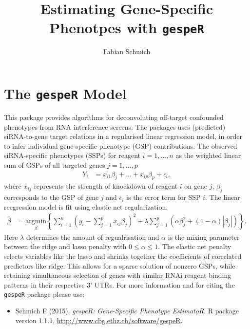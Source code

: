 \documentclass{article}\usepackage[]{graphicx}\usepackage[]{color}
\begin{document}
\title{Estimating Gene-Specific Phenotpes with \texttt{gespeR}}
\author{Fabian Schmich}

\maketitle
\tableofcontents

\section{The \texttt{gespeR} Model}
This package provides algorithms for deconvoluting off-target confounded phenotypes from RNA interference screens. The packages uses (predicted) siRNA-to-gene target relations in a regularised linear regression model, in order to infer individual gene-specific phenotype (GSP) contributions. The observed siRNA-specific phenotypes (SSPs) for reagent $i = 1,\ldots,n$ as the weighted linear sum of GSPs of all targeted genes $j = 1,\ldots,p$
\begin{align}
Y_i &= x_{i1}\beta_j + \ldots + x_{ip}\beta_p + \epsilon_i,
\end{align}
where $x_{ij}$ represents the strength of knockdown of reagent $i$ on gene $j$, $\beta_j$ corresponds to the GSP of gene $j$ and $\epsilon_i$ is the error term for SSP $i$. The linear reegression model is fit using elastic net regularization:
\begin{align}
\hat{\beta} &= \underset{\beta}{\text{argmin}} \left\{ \sum_{i=1}^n \left( y_i - \sum_{j=1}^p x_{ij}\beta_j \right)^2 + \lambda \sum_{j=1}^p \left(  \alpha\beta_j^2 + \left(1 - \alpha \right) |\beta_j| \right) \right\}.
\end{align}
Here $\lambda$ determines the amount of regualrisation and $\alpha$ is the mixing parameter between the ridge and lasso penalty with $0 \leq \alpha \leq 1$. The elastic net penalty selects variables like the lasso and shrinks together the coefficients of correlated predictors like ridge. This allows for a sparse solution of nonzero GSPs, while retaining simultaneous selection of genes with similar RNAi reagent binding patterns in their respective 3' UTRs. For more information and for citing the \texttt{gespeR} package please use:
\begin{itemize}
\item[]
Schmich F (2015).
\emph{gespeR: Gene-Specific Phenotype EstimatoR}.
R package version 1.1.1, \url{http://www.cbg.ethz.ch/software/gespeR}.

\end{itemize}
\end{document}
